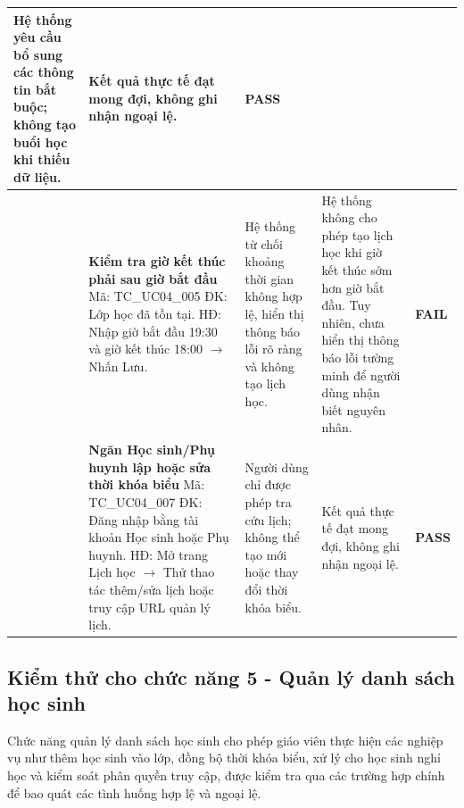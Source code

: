 \begin{longtable}{|>{\centering\arraybackslash}p{0.8cm}|>{\raggedright\arraybackslash}p{4.6cm}|>{\raggedright\arraybackslash}p{3.8cm}|>{\raggedright\arraybackslash}p{3.8cm}|>{\centering\arraybackslash}p{1.5cm}|}
Hệ thống yêu cầu bổ sung các thông tin bắt buộc; không tạo buổi học khi thiếu dữ liệu. &
Kết quả thực tế đạt mong đợi, không ghi nhận ngoại lệ. & \textbf{PASS} \\
\hline
4 & \textbf{Kiểm tra giờ kết thúc phải sau giờ bắt đầu}\newline
Mã: TC\_UC04\_005\newline
ĐK: Lớp học đã tồn tại.\newline
HĐ: Nhập giờ bắt đầu 19:30 và giờ kết thúc 18:00 $\rightarrow$ Nhấn Lưu. &
Hệ thống từ chối khoảng thời gian không hợp lệ, hiển thị thông báo lỗi rõ ràng và không tạo lịch học. &
Hệ thống không cho phép tạo lịch học khi giờ kết thúc sớm hơn giờ bắt đầu. Tuy nhiên, chưa hiển thị thông báo lỗi tường minh để người dùng nhận biết nguyên nhân. & \textbf{FAIL} \\
\hline
5 & \textbf{Ngăn Học sinh/Phụ huynh lập hoặc sửa thời khóa biểu}\newline
Mã: TC\_UC04\_007\newline
ĐK: Đăng nhập bằng tài khoản Học sinh hoặc Phụ huynh.\newline
HĐ: Mở trang Lịch học $\rightarrow$ Thử thao tác thêm/sửa lịch hoặc truy cập URL quản lý lịch. &
Người dùng chỉ được phép tra cứu lịch; không thể tạo mới hoặc thay đổi thời khóa biểu. &
Kết quả thực tế đạt mong đợi, không ghi nhận ngoại lệ. & \textbf{PASS} \\
\hline
\end{longtable}

\vspace{0.8em}
\subsection{Kiểm thử cho chức năng 5 - Quản lý danh sách học sinh}
Chức năng quản lý danh sách học sinh cho phép giáo viên thực hiện các nghiệp vụ như thêm học sinh vào lớp, đồng bộ thời khóa biểu, xử lý cho học sinh nghỉ học và kiểm soát phân quyền truy cập, được kiểm tra qua các trường hợp chính để bao quát các tình huống hợp lệ và ngoại lệ.


